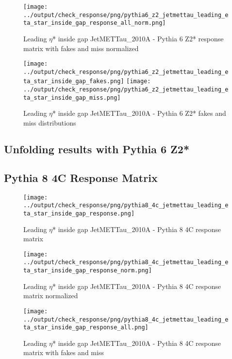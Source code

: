 \documentclass[11pt]{book}
\begin{document}
\begin{figure}[ht]
\centering
\texttt{[image: ../output/check\_response/png/pythia6\_z2\_jetmettau\_leading\_eta\_star\_inside\_gap\_response\_all\_norm.png]}
\caption{Leading $\eta$* inside gap JetMETTau\_2010A - Pythia 6 Z2* response matrix with fakes and miss normalized}
\label{p6_jetmettau_leading_eta_star_inside_gap_response_all_norm}
\end{figure}

\begin{figure}[ht]
\centering
\texttt{[image: ../output/check\_response/png/pythia6\_z2\_jetmettau\_leading\_eta\_star\_inside\_gap\_fakes.png]}
\texttt{[image: ../output/check\_response/png/pythia6\_z2\_jetmettau\_leading\_eta\_star\_inside\_gap\_miss.png]}
\caption{Leading $\eta$* inside gap JetMETTau\_2010A - Pythia 6 Z2* fakes and miss distributions}
\label{p6_jetmettau_leading_eta_star_inside_gap_fakesmiss}
\end{figure}


\clearpage
\subsection{Unfolding results with Pythia 6 Z2*}


\clearpage
\subsection{Pythia 8 4C Response Matrix}


\begin{figure}[ht]
\centering
\texttt{[image: ../output/check\_response/png/pythia8\_4c\_jetmettau\_leading\_eta\_star\_inside\_gap\_response.png]}
\caption{Leading $\eta$* inside gap JetMETTau\_2010A - Pythia 8 4C response matrix}
\label{p8_jetmettau_leading_eta_star_inside_gap_response}
\end{figure}

\begin{figure}[ht]
\centering
\texttt{[image: ../output/check\_response/png/pythia8\_4c\_jetmettau\_leading\_eta\_star\_inside\_gap\_response\_norm.png]}
\caption{Leading $\eta$* inside gap JetMETTau\_2010A - Pythia 8 4C response matrix normalized}
\label{p8_jetmettau_leading_eta_star_inside_gap_response_norm}
\end{figure}

\begin{figure}[ht]
\centering
\texttt{[image: ../output/check\_response/png/pythia8\_4c\_jetmettau\_leading\_eta\_star\_inside\_gap\_response\_all.png]}
\caption{Leading $\eta$* inside gap JetMETTau\_2010A - Pythia 8 4C response matrix with fakes and miss}
\label{p8_jetmettau_leading_eta_star_inside_gap_response_all}
\end{figure}
\end{document}
